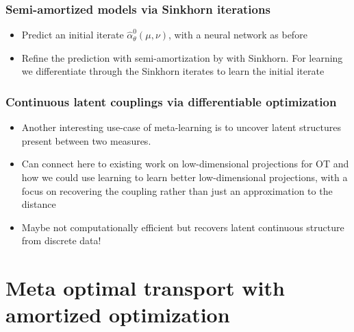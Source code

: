 \subsubsection{Semi-amortized models via Sinkhorn iterations}
\begin{center}
\end{center}
\begin{itemize}
\item Predict an initial iterate $\hat \alpha_\theta^0(\mu, \nu)$,
  with a neural network as before
\item Refine the prediction with semi-amortization by with Sinkhorn.
  For learning we differentiate through the Sinkhorn iterates
  to learn the initial iterate
\end{itemize}

\subsubsection{Continuous latent couplings via differentiable optimization}
\begin{itemize}
\item Another interesting use-case of meta-learning is to uncover
  latent structures present between two measures.
\item Can connect here to existing work on low-dimensional
  projections for OT and how we could use learning to learn
  better low-dimensional projections, with a focus on
  recovering the coupling rather than just an approximation
  to the distance
\item Maybe not computationally efficient but recovers
  latent continuous structure from discrete data!
\end{itemize}
\todoc



\section{Meta optimal transport with amortized optimization}

